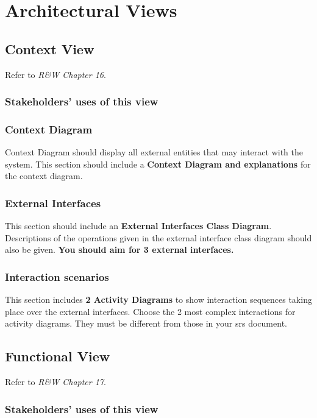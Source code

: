 \chapter{Architectural Views} \label{ArchitecturalViews}


\section{Context View}

Refer to \textit{R\&W Chapter 16}. 

\subsection{Stakeholders’ uses of this view}

\subsection{Context Diagram}

Context Diagram should display all external entities that may interact with the system. This section should include a \textbf{Context Diagram and explanations} for the context diagram.

\subsection{External Interfaces}
This section should include an \textbf{External Interfaces Class Diagram}. Descriptions of the operations given in the external interface class diagram should also be given. \textbf{You should aim for 3 external interfaces.}

\subsection{Interaction scenarios}
This section includes \textbf{2 Activity Diagrams} to show interaction sequences taking place over the external interfaces. Choose the 2 most complex interactions for activity diagrams. They must be different from those in your \gls{srs} document.




\section{Functional View}

Refer to \textit{R\&W Chapter 17}. 

\subsection{Stakeholders’ uses of this view}

